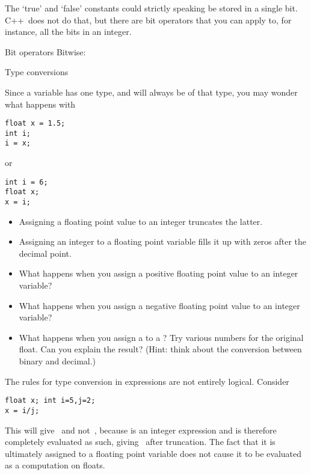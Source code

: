 The `true' and `false' constants could strictly speaking be stored in
a single bit. C++~does not do that, but there are bit
operators that you can apply to, for instance, all the bits in an integer.

\begin{block}{Bit operators}
  \label{sl:bit-oper}
 Bitwise: \n{& | ^}
\end{block}

 {Type conversions}

Since a variable has one type, and will always be of that type,
you may wonder what happens with
\begin{verbatim}
float x = 1.5;
int i;
i = x;
\end{verbatim}
or 
\begin{verbatim}
int i = 6;
float x;
x = i;
\end{verbatim}

\begin{itemize}
\item Assigning a floating point value to an integer truncates the
  latter.
\item Assigning an integer to a floating point variable fills it up
  with zeros after the decimal point.
\end{itemize}

\begin{exercise}
  \label{ex:float-convert}
  \begin{itemize}
  \item What happens when you assign a positive floating
    point value to an integer variable?
  \item What happens when you assign a negative floating
    point value to an integer variable?
  \item What happens when you assign a  to a ? 
    Try various numbers for the original float. Can you explain the
    result?
    (Hint: think about the conversion between binary and decimal.)
  \end{itemize}
\end{exercise}

The rules for type conversion in expressions are not entirely
logical. Consider
\begin{verbatim}
float x; int i=5,j=2;
x = i/j;
\end{verbatim}
This will give~ and not~, because  is an integer
expression and is therefore completely evaluated as such, giving~
after truncation. The fact
that it is ultimately assigned to a floating point variable does not
cause it to be evaluated as a computation on floats.

